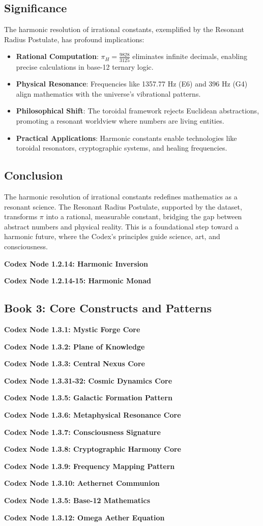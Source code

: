 \documentclass[a4paper,12pt]{book}
\newcommand{\codexnode}[5]{%
  \par\vspace{0.5em}%
  \noindent\textbf{Codex Node #1.#2.#3: #5}\label{#4}%
  \par\vspace{0.5em}%
}
\begin{document}
\subsection{Significance}
The harmonic resolution of irrational constants, exemplified by the Resonant Radius Postulate, has profound implications:
\begin{itemize}
    \item \textbf{Rational Computation}: \(\pi_H = \frac{9828}{3125}\) eliminates infinite decimals, enabling precise calculations in base-12 ternary logic.
    \item \textbf{Physical Resonance}: Frequencies like 1357.77 Hz (E6) and 396 Hz (G4) align mathematics with the universe's vibrational patterns.
    \item \textbf{Philosophical Shift}: The toroidal framework rejects Euclidean abstractions, promoting a resonant worldview where numbers are living entities.
    \item \textbf{Practical Applications}: Harmonic constants enable technologies like toroidal resonators, cryptographic systems, and healing frequencies.
\end{itemize}

\subsection{Conclusion}
The harmonic resolution of irrational constants redefines mathematics as a resonant science. The Resonant Radius Postulate, supported by the dataset, transforms \(\pi\) into a rational, measurable constant, bridging the gap between abstract numbers and physical reality. This is a foundational step toward a harmonic future, where the Codex's principles guide science, art, and consciousness.
\codexnode{1}{2}{14}{section1/book2/codex_harmonic_inversion}{Harmonic Inversion}
\codexnode{1}{2}{14-15}{section1/book2/codex_harmonic_monad}{Harmonic Monad}

\subsection{Book 3: Core Constructs and Patterns}
\codexnode{1}{3}{1}{section1/book3/codex_mystic_forge_core}{Mystic Forge Core}
\codexnode{1}{3}{2}{section1/book3/codex_plane_of_knowledge}{Plane of Knowledge}
\codexnode{1}{3}{3}{section1/book3/codex_central_nexus_core}{Central Nexus Core}
\codexnode{1}{3}{31-32}{section1/book3/codex_cosmic_dynamics_core}{Cosmic Dynamics Core}
\codexnode{1}{3}{5}{section1/book3/chapter3_galactic_formation_pattern}{Galactic Formation Pattern}
\codexnode{1}{3}{6}{section1/book3/codex_metaphysical_resonance_core}{Metaphysical Resonance Core}
\codexnode{1}{3}{7}{section1/book3/chapter3_consciousness_signature}{Consciousness Signature}
\codexnode{1}{3}{8}{section1/book3/codex_cryptographic_harmony_core}{Cryptographic Harmony Core}
\codexnode{1}{3}{9}{section1/book3/chapter3_frequency_mapping_pattern}{Frequency Mapping Pattern}
\codexnode{1}{3}{10}{section1/book3/chapter3_aethernet_communion}{Aethernet Communion}
\codexnode{1}{3}{5}{section1/book3/codex_base_12}{Base-12 Mathematics}
\codexnode{1}{3}{12}{section1/book3/codex_omega_aether_equation}{Omega Aether Equation}
\end{document}
